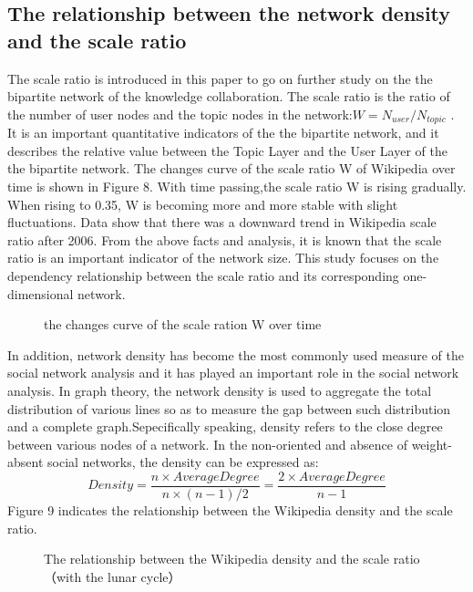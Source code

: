\documentclass{elsarticle}
\begin{document}
\subsection{The relationship between the network density and the scale ratio}
\label{sec:relat-betw-netw}
The scale ratio is introduced in this paper to go on further study on
the the bipartite network of the knowledge collaboration. The scale
ratio is the ratio of the number of user nodes and the topic nodes in
the network:$W=N_{user}/N_{topic}$ . It is an important quantitative
indicators of the the bipartite network, and it describes the relative
value between the Topic Layer and the User Layer of the the bipartite
network. The changes curve of the scale ratio W of Wikipedia over time
is shown in Figure 8. With time passing,the scale ratio W is rising
gradually. When rising to 0.35, W is becoming more and more stable
with slight fluctuations. Data show that there was a downward trend in
Wikipedia scale ratio after 2006. From the above facts and analysis,
it is known that the scale ratio is an important indicator of the
network size. This study focuses on the dependency relationship
between the scale ratio and its corresponding one-dimensional network.
\begin{figure}[htpb]
  \centering
  \scalebox{0.3}{\texttt{[image: 08]}}
  \caption{the changes curve of the scale ration W over time}
\end{figure}
In addition, network density has become the most commonly used measure of the social network analysis and it has played an important role in the social network analysis. In graph theory, the network density is used to aggregate the total distribution of various lines so as to measure the gap between such distribution and a complete graph.Sepecifically speaking, density refers to the close degree between various nodes of a network. In the non-oriented and absence of weight-absent social networks, the density can be expressed as:
\begin{equation}
  \label{eq:3}
  Density=\frac{n\times AverageDegree}{n\times(n-1)/2}=\frac{2\times AverageDegree}{n-1}
\end{equation}
Figure 9 indicates the relationship between the Wikipedia density and the scale ratio. 
\begin{figure}[htpb]
  \centering
  \scalebox{0.3}{\texttt{[image: 09]}}
  \caption{The relationship between the Wikipedia density and the scale ratio （with the lunar cycle）}
\end{figure}
\end{document}
